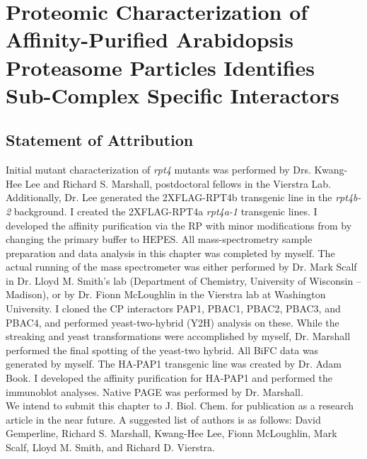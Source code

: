 \chapter{Proteomic Characterization of Affinity-Purified Arabidopsis Proteasome Particles Identifies Sub-Complex Specific Interactors}
 
\section{Statement of Attribution}
Initial mutant characterization of \textit{rpt4} mutants was performed by Drs. Kwang-Hee Lee and Richard S. Marshall, postdoctoral fellows in the Vierstra Lab. Additionally, Dr. Lee generated the 2XFLAG-RPT4b transgenic line in the \textit{rpt4b-2} background.  I created the 2XFLAG-RPT4a \textit{rpt4a-1} transgenic lines. I developed the affinity purification via the RP with minor modifications from \citep{book10} by changing the primary buffer to HEPES. All mass-spectrometry sample preparation and data analysis in this chapter was completed by myself.  The actual running of the mass spectrometer was either performed by Dr. Mark Scalf in Dr. Lloyd M. Smith’s lab (Department of Chemistry, University of Wisconsin – Madison), or by Dr. Fionn McLoughlin in the Vierstra lab at Washington University.  I cloned the CP interactors PAP1, PBAC1, PBAC2, PBAC3, and PBAC4, and performed yeast-two-hybrid (Y2H) analysis on these.  While the streaking and yeast transformations were accomplished by myself, Dr. Marshall performed the final spotting of the yeast-two hybrid.  All BiFC data was generated by myself.  The HA-PAP1 transgenic line was created by Dr. Adam Book.  I developed the affinity purification for HA-PAP1 and performed the immunoblot analyses.  Native PAGE was performed by Dr. Marshall. \\


\noindent
We intend to submit this chapter to J. Biol. Chem. for publication as a research article in the near future.  A suggested list of authors is as follows: David Gemperline, Richard S. Marshall, Kwang-Hee Lee, Fionn McLoughlin, Mark Scalf, Lloyd M. Smith, and Richard D. Vierstra. 

